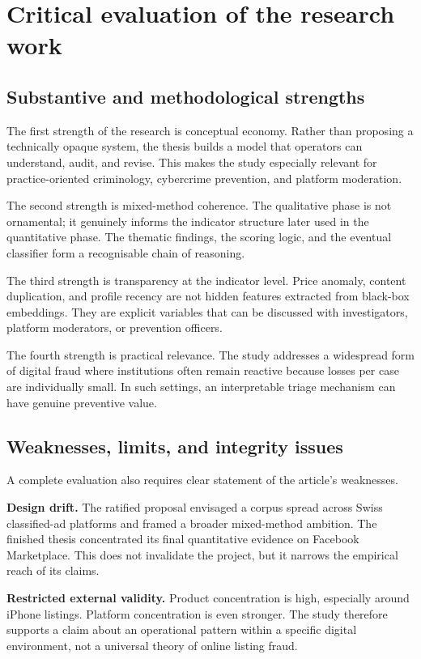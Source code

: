 \documentclass[11pt,a4paper]{article}
\begin{document}
\section{Critical evaluation of the research work}
\subsection{Substantive and methodological strengths}
The first strength of the research is conceptual economy. Rather than proposing a technically opaque system, the thesis builds a model that operators can understand, audit, and revise. This makes the study especially relevant for practice-oriented criminology, cybercrime prevention, and platform moderation.

The second strength is mixed-method coherence. The qualitative phase is not ornamental; it genuinely informs the indicator structure later used in the quantitative phase. The thematic findings, the scoring logic, and the eventual classifier form a recognisable chain of reasoning.

The third strength is transparency at the indicator level. Price anomaly, content duplication, and profile recency are not hidden features extracted from black-box embeddings. They are explicit variables that can be discussed with investigators, platform moderators, or prevention officers.

The fourth strength is practical relevance. The study addresses a widespread form of digital fraud where institutions often remain reactive because losses per case are individually small. In such settings, an interpretable triage mechanism can have genuine preventive value.

\subsection{Weaknesses, limits, and integrity issues}
A complete evaluation also requires clear statement of the article's weaknesses.

\textbf{Design drift.} The ratified proposal envisaged a corpus spread across Swiss classified-ad platforms and framed a broader mixed-method ambition. The finished thesis concentrated its final quantitative evidence on Facebook Marketplace. This does not invalidate the project, but it narrows the empirical reach of its claims.

\textbf{Restricted external validity.} Product concentration is high, especially around iPhone listings. Platform concentration is even stronger. The study therefore supports a claim about an operational pattern within a specific digital environment, not a universal theory of online listing fraud.
\end{document}
